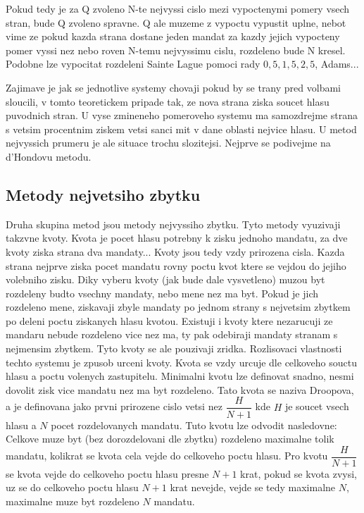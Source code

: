 \documentclass[12pt,a4paper]{report}
\begin{document}
Pokud tedy je za Q zvoleno N-te nejvyssi cislo mezi vypoctenymi pomery vsech stran, bude Q zvoleno spravne.
Q ale muzeme z vypoctu vypustit uplne, nebot vime ze pokud kazda strana dostane jeden mandat za kazdy jejich vypocteny pomer vyssi nez nebo roven N-temu nejvyssimu cislu, rozdeleno bude N kresel.
Podobne lze vypocitat rozdeleni Sainte Lague pomoci rady $0{,}5, 1{,}5, 2{,}5$, Adams... %

Zajimave je jak se jednotlive systemy chovaji pokud by se trany pred volbami sloucili, v tomto teoretickem pripade tak, ze nova strana ziska soucet hlasu puvodnich stran.
U vyse zmineneho pomeroveho systemu ma samozdrejme strana s vetsim procentnim ziskem vetsi sanci mit v dane oblasti nejvice hlasu.
U metod nejvyssich prumeru je ale situace trochu slozitejsi.
Nejprve se podivejme na d'Hondovu metodu.


\subsection{Metody nejvetsiho zbytku}
Druha skupina metod jsou metody nejvyssiho zbytku.
Tyto metody vyuzivaji takzvne kvoty.
Kvota je pocet hlasu potrebny k zisku jednoho mandatu, za dve kvoty ziska strana dva mandaty...
Kvoty jsou tedy vzdy prirozena cisla.
Kazda strana nejprve ziska pocet mandatu rovny poctu kvot ktere se vejdou do jejiho volebniho zisku.
Diky vyberu kvoty (jak bude dale vysvetleno) muzou byt rozdeleny budto vsechny mandaty, nebo mene nez ma byt.
Pokud je jich rozdeleno mene, ziskavaji zbyle mandaty po jednom strany s nejvetsim zbytkem po deleni poctu ziskanych hlasu kvotou.
Existuji i kvoty ktere nezarucuji ze mandaru nebude rozdeleno vice nez ma, ty pak odebiraji mandaty stranam s nejmensim zbytkem.
Tyto kvoty se ale pouzivaji zridka.
Rozlisovaci vlastnosti techto systemu je zpusob urceni kvoty.
Kvota se vzdy urcuje dle celkoveho souctu hlasu a poctu volenych zastupitelu.
Minimalni kvotu lze definovat snadno, nesmi dovolit zisk vice mandatu nez ma byt rozdeleno.
Tato kvota se naziva Droopova, a je definovana jako prvni prirozene cislo vetsi nez $\dfrac{H}{N+1}$ kde $H$ je soucet vsech hlasu a $N$ pocet rozdelovanych mandatu.
Tuto kvotu lze odvodit nasledovne: Celkove muze byt (bez dorozdelovani dle zbytku) rozdeleno maximalne tolik mandatu, kolikrat se kvota cela vejde do celkoveho poctu hlasu.
Pro kvotu $\dfrac{H}{N+1}$ se kvota vejde do celkoveho poctu hlasu presne $N+1$ krat, pokud se kvota zvysi, uz se do celkoveho poctu hlasu $N+1$ krat nevejde, vejde se tedy maximalne $N$, maximalne muze byt rozdeleno $N$ mandatu.
\end{document}
